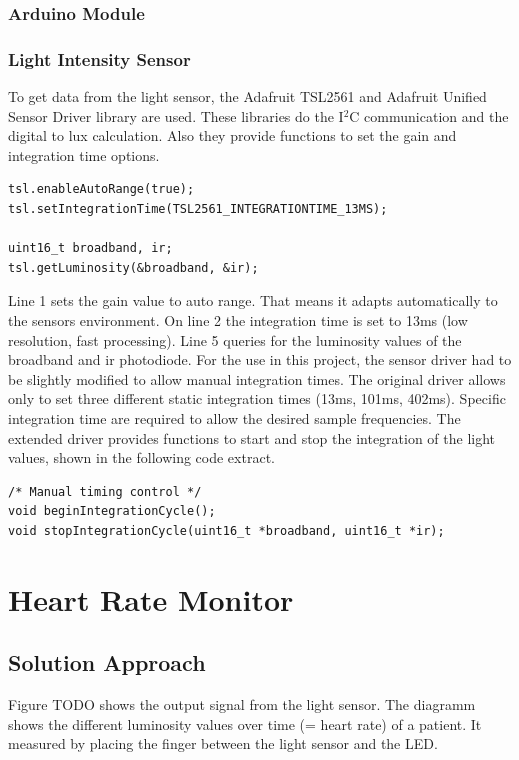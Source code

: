 \documentclass[oneside, notitlepage]{scrreprt}
\begin{document}
\subsection{Arduino Module}

\subsection{Light Intensity Sensor}
\label{subsec:light-intensity-sensor-software}
To get data from the light sensor, the Adafruit TSL2561 and Adafruit Unified Sensor Driver library are used. These libraries do the I$^{2}$C communication and the digital to lux calculation. Also they provide functions to set the gain and integration time options. \cite{bib:tsl-library} \cite{bib:sensor-library}

\begin{lstlisting}[caption=Adafruit driver]
tsl.enableAutoRange(true);
tsl.setIntegrationTime(TSL2561_INTEGRATIONTIME_13MS);

uint16_t broadband, ir;
tsl.getLuminosity(&broadband, &ir);
\end{lstlisting}

Line 1 sets the gain value to auto range. That means it adapts automatically to the sensors environment. On line 2 the integration time is set to 13ms (low resolution, fast processing). Line 5 queries for the luminosity values of the broadband and ir photodiode. For the use in this project, the sensor driver had to be slightly modified to allow manual integration times. The original driver allows only to set three different static integration times (13ms, 101ms, 402ms). Specific integration time are required to allow the desired sample frequencies. The extended driver provides functions to start and stop the integration of the light values, shown in the following code extract.

\begin{lstlisting}[caption=Adafruit\_TSL2561\_U.h]
/* Manual timing control */
void beginIntegrationCycle();
void stopIntegrationCycle(uint16_t *broadband, uint16_t *ir);
\end{lstlisting}

\chapter{Heart Rate Monitor}
\label{chap:hrm}

\section{Solution Approach}
Figure TODO shows the output signal from the light sensor. The diagramm shows the different luminosity values over time (= heart rate) of a patient.
It measured by placing the finger between the light sensor and the LED.
\end{document}
